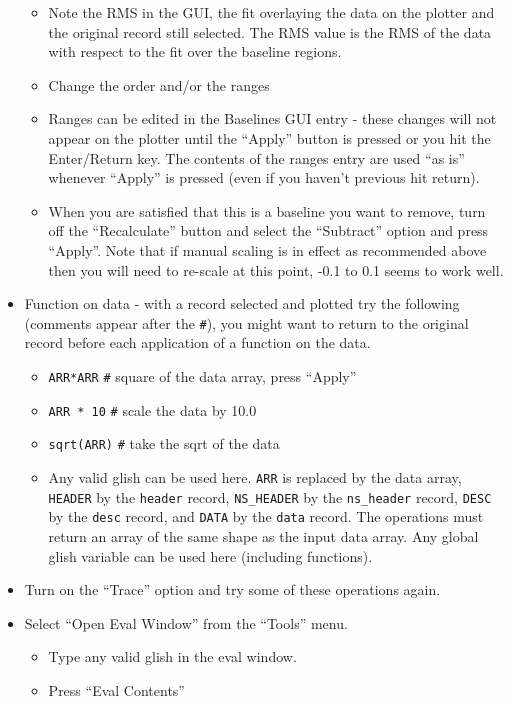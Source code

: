 \begin{itemize}
\begin{itemize}
\item Note the RMS in the GUI, the fit overlaying the data on the 
plotter and the original record still selected.  The RMS value is the
RMS of the data with respect to the fit over the baseline regions.
\item Change the order and/or the ranges
\item Ranges can be edited in the Baselines GUI entry - these changes will
not appear on the plotter until the ``Apply'' button is pressed or you hit
the Enter/Return key.  The contents of the ranges entry are used ``as 
is'' whenever ``Apply'' is pressed (even if you haven't previous hit return).
\item When you are satisfied that this is a baseline you want to remove,
turn off the ``Recalculate'' button and select the ``Subtract'' option
and press ``Apply''.  Note that if manual scaling is in effect as recommended
above then you will need to re-scale at this point,  -0.1 to 0.1 seems to
work well.
\end{itemize}
\item Function on data - with a record selected and plotted try the following
(comments appear after the \verb_#_), you might want to return to the original
record before each application of a function on the data.
\begin{itemize}
\item {\tt ARR*ARR}  \verb_#_ square of the data array, press ``Apply''
\item {\tt ARR * 10}  \verb_#_ scale the data by 10.0
\item {\tt sqrt(ARR)} \verb_#_ take the sqrt of the data
\item Any valid glish can be used here. {\tt ARR} is replaced by the data 
array, {\tt HEADER} by
the {\tt header} record, {\tt NS\_HEADER} by the {\tt ns\_header} 
record, {\tt DESC} by the 
{\tt desc} record, and {\tt DATA} by the {\tt data} record.  
The operations must return
an array of the same shape as the input data array.  Any global glish
variable can be used here (including functions).
\end{itemize}
\item Turn on the ``Trace'' option and try some of these operations again.
\item Select ``Open Eval Window'' from the ``Tools'' menu.
\begin{itemize}
\item Type any valid glish in the eval window.
\item Press ``Eval Contents''

\end{itemize}
\end{itemize}
